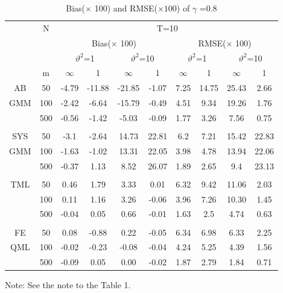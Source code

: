 \documentclass[12pt,a4paper,hyperref]{article}
\begin{document}
\begin{center}
\begin{table}[H]
\caption{Bias($\times$ 100) and RMSE($\times 100$) of $\gamma$ =0.8}  \label{table4}
\centering
\begin{tabular} {*{10}{c}}
\toprule
&N& \multicolumn{8}{c}{T=10}\\
\cmidrule(lr){3-10}
&& \multicolumn{4}{c}{Bias($\times$ 100)} & \multicolumn{4}{c}{RMSE($\times$ 100)}\\
  \cmidrule(lr){3-6} \cmidrule(lr){7-10}
&&  \multicolumn{2}{c}{$\vartheta^{2}$=1}&\multicolumn{2}{c}{$\vartheta^{2}$=10} & \multicolumn{2}{c}{$\vartheta^{2}$=1}&\multicolumn{2}{c}{$\vartheta^{2}$=10}\\
\cmidrule(lr){3-4} \cmidrule(lr){5-6}\cmidrule(lr){7-8}\cmidrule(lr){9-10}
& m & $\infty$ &1&$\infty$ &1&$\infty$ &1&$\infty$&1\\
\cmidrule(lr){3-4} \cmidrule(lr){5-6}\cmidrule(lr){7-8}\cmidrule(lr){9-10}
AB &50 	&-4.79&-11.88&-21.85&-1.07	&7.25&14.75&25.43&	2.66 \\
GMM &100&-2.42 & -6.64& -15.79& -0.49&4.51 &9.34 &19.26 &1.76 \\
&500 &-0.56	&-1.42&-5.03&-0.09&1.77&3.26&7.56&0.75  \\
\midrule \\
\cmidrule(lr){3-4} \cmidrule(lr){5-6}\cmidrule(lr){7-8}\cmidrule(lr){9-10}
 SYS&50 &-3.1	&-2.64&14.73&	22.81&	6.2	&	7.21	&15.42&22.83 \\
  GMM&100 &-1.63 & -1.02& 13.31&22.05 & 3.98& 4.78& 13.94&22.06 \\
 &500 &	-0.37&	1.13&8.52&	26.07	&1.89	&	2.65&9.4&23.13\\
 \midrule \\
\cmidrule(lr){3-4} \cmidrule(lr){5-6}\cmidrule(lr){7-8}\cmidrule(lr){9-10}
TML &50 &0.46&1.79&3.33&	0.01&6.32&9.42&11.06&2.03\\
&100 &0.11 &1.16&3.26 &-0.06 &3.96 & 7.26& 10.30&1.45 \\
 &500 & -0.04&	0.05&0.66&	-0.01&1.63&2.5&4.74&0.63  \\
 \midrule \\
\cmidrule(lr){3-4} \cmidrule(lr){5-6}\cmidrule(lr){7-8}\cmidrule(lr){9-10}
 FE&50 &0.08	&-0.88	&0.22	&-0.05&6.34	&6.98&	6.33&	2.25
\\
  QML&100 &-0.02	&-0.23	&-0.08	&-0.04&	4.24&	5.25	&4.39	&1.56
 \\
&500 &-0.09	&0.05	&0.00&	-0.02	&1.87	&2.79	&1.84	&0.71
 \\
\bottomrule
\end{tabular}
\begin{tablenotes}
      \small
      \item Note: See the note to the Table 1.
    \end{tablenotes}
\end{table}
\end{center}
\end{document}
